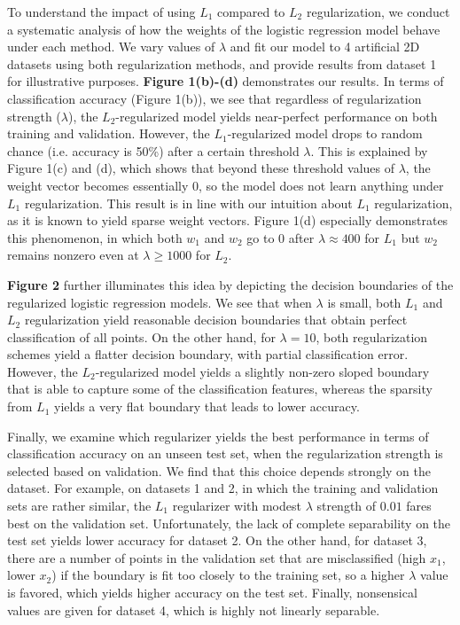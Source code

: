 \documentclass[10pt,psamsfonts]{amsart}
\theoremstyle{definition}
\theoremstyle{remark}
\numberwithin{equation}{section}
\begin{document}
To understand the impact of using $L_1$ compared to $L_2$ regularization, we conduct a systematic analysis of how the weights of the logistic regression model behave under each method. We vary values of $\lambda$ and fit our model to 4 artificial 2D datasets using both regularization methods, and provide results from dataset 1 for illustrative purposes. {\bf Figure 1(b)-(d)} demonstrates our results. In terms of classification accuracy (Figure 1(b)), we see that regardless of regularization strength ($\lambda$), the $L_2$-regularized model yields near-perfect performance on both training and validation. However, the $L_1$-regularized model drops to random chance (i.e. accuracy is 50\%) after a certain threshold $\lambda$. This is explained by Figure 1(c) and (d), which shows that beyond these threshold values of $\lambda$, the weight vector becomes essentially 0, so the model does not learn anything under $L_1$ regularization. This result is in line with our intuition about $L_1$ regularization, as it is known to yield sparse weight vectors. Figure 1(d) especially demonstrates this phenomenon, in which both $w_1$ and $w_2$ go to 0 after $\lambda \approx 400$ for $L_1$ but $w_2$ remains nonzero even at $\lambda \geq 1000$ for $L_2$.

{\bf Figure 2} further illuminates this idea by depicting the decision boundaries of the regularized logistic regression models. We see that when $\lambda$ is small, both $L_1$ and $L_2$ regularization yield reasonable decision boundaries that obtain perfect classification of all points. On the other hand, for $\lambda =10$, both regularization schemes yield a flatter decision boundary, with partial classification error. However, the $L_2$-regularized model yields a slightly non-zero sloped boundary that is able to capture some of the classification features, whereas the sparsity from $L_1$ yields a very flat boundary that leads to lower accuracy.

Finally, we examine which regularizer yields the best performance in terms of classification accuracy on an unseen test set, when the regularization strength is selected based on validation. We find that this choice depends strongly on the dataset. For example, on datasets 1 and 2, in which the training and validation sets are rather similar, the $L_1$ regularizer with modest $\lambda$ strength of $0.01$ fares best on the validation set. Unfortunately, the lack of complete separability on the test set yields lower accuracy for dataset 2. On the other hand, for dataset 3, there are a number of points in the validation set that are misclassified (high $x_1$, lower $x_2$) if the boundary is fit too closely to the training set, so a higher $\lambda$ value is favored, which yields higher accuracy on the test set. Finally, nonsensical values are given for dataset 4, which is highly not linearly separable.
\end{document}
